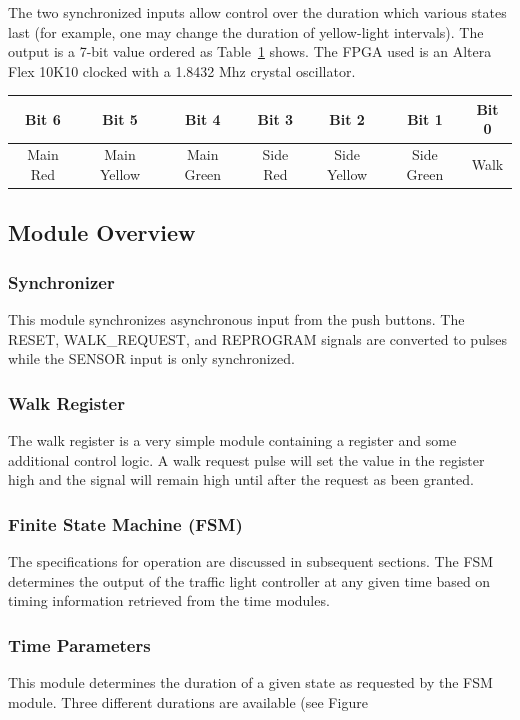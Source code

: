 \documentclass[11]{article}
\begin{document}
	The two synchronized inputs allow control over the duration which
	various states last (for example, one may change the duration of
	yellow-light intervals).  The output is a 7-bit value ordered as
	Table~\ref{tbl:output} shows.  The FPGA used is an Altera Flex 10K10
	clocked with a 1.8432 Mhz crystal oscillator.
	\begin{table}
	\centering
		\begin{tabular}{|c|c|c|c|c|c|c|}
		\hline
		Bit 6 & Bit 5 & Bit 4 & Bit 3 & Bit 2 & Bit 1 & Bit 0 \\ \hline
		Main Red & Main Yellow & Main Green & Side Red & Side Yellow & Side Green & Walk \\ \hline
		\end{tabular}
	\label{tbl:output}
	\end{table}
	

	\subsection{Module Overview}
		\subsubsection{Synchronizer}
		This module synchronizes asynchronous input from the
		push buttons.  The RESET, WALK\_REQUEST, and REPROGRAM
		signals are converted to pulses while the SENSOR input
		is only synchronized.

		\subsubsection{Walk Register}
		The walk register is a very simple module containing a
		register and some additional control logic.  A walk
		request pulse will set the value in the register high
		and the signal will remain high until after the request
		as been granted.

		\subsubsection{Finite State Machine (FSM)}
		The specifications for operation are discussed in
		subsequent sections.  The FSM determines the output of the
		traffic light controller at any given time based on
		timing information retrieved from the time modules.

		\subsubsection{Time Parameters}
		This module determines the duration of a given state
		as requested by the FSM module.  Three different
		durations are available (see Figure 
\end{document}

